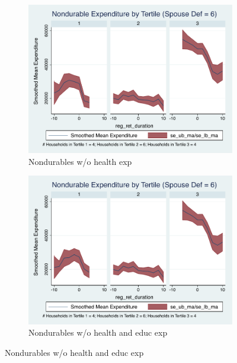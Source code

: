 \documentclass[11pt,onecolumn]{article}
\numberwithin{figure}{section}
\begin{document}
\begin{figure}
  \begin{subfigure}{0.5\textwidth}
  \centering
 	\includegraphics[width=0.9\linewidth]{../ConsumptionPostRetirement_by_SpouseDef/Smoothed_xhealth/spouse_def_6.pdf}
    \caption{Nondurables w/o health exp}
    \label{fig:chapter001_dist_001}
  \end{subfigure}
  	\hspace{1cm}
  \begin{subfigure}{0.5\textwidth}
 	\includegraphics[width=0.9\linewidth]{../ConsumptionPostRetirement_by_SpouseDef/Smoothed_xhealth_educ/spouse_def_6.pdf}
    \caption{Nondurables w/o health and educ exp}
    \label{fig:chapter001_reward_001}
  \end{subfigure}
\end{figure}
\clearpage
\end{document}
